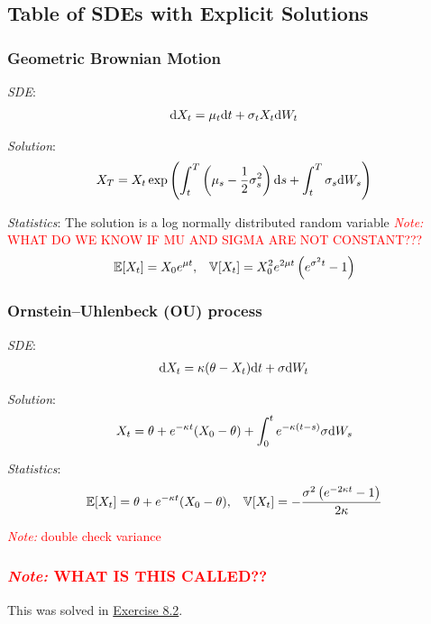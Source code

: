 \documentclass[12pt]{article}
\newcommand{\note}[1]{\textcolor{red}{\textit{Note:} #1}}
\begin{document}
\subsection{Table of SDEs with Explicit Solutions}
\subsubsection{Geometric Brownian Motion}
\textit{SDE}:
\begin{align*}
    \mathrm{d} X_t = \mu_t \mathrm{d} t + \sigma_t X_t \mathrm{d} W_t
\end{align*}

\textit{Solution}:
\begin{align*}
    X_T = X_t  \exp\left( \int_t^T \left( \mu_s - \frac{1}{2}\sigma_s^2\right)\mathrm{d} s + \int_t^T\sigma_s \mathrm{d} W_s \right)
\end{align*}

\textit{Statistics}:
The solution is a log normally distributed random variable
\note{WHAT DO WE KNOW IF MU AND SIGMA ARE NOT CONSTANT???}
\begin{align*}
    \mathbb{E}[X_t] = X_0 e^{\mu t} 
    ,&&
    \mathbb{V}[X_t] = X_0^2 e^{2\mu t} \left( e^{\sigma^2 t}-1 \right)
\end{align*}


\subsubsection{Ornstein--Uhlenbeck (OU) process}
\textit{SDE}:
\begin{align*}
    \mathrm{d} X_t = \kappa(\theta-X_t)\mathrm{d} t + \sigma \mathrm{d} W_t
\end{align*}

\textit{Solution}:
\begin{align*}
    X_t = \theta + e^{-\kappa t}(X_0-\theta) + \int_0^t e^{-\kappa(t-s)}\sigma \mathrm{d} W_s
\end{align*}

\textit{Statistics}:
\begin{align*}
    \mathbb{E}[X_t] =  \theta + e^{-\kappa t}(X_0 - \theta)
    ,&&
    \mathbb{V}[X_t] = -\frac{\sigma ^2 \left(e^{-2 \kappa  t}-1\right)}{2 \kappa } 
\end{align*}

\note{double check variance}

\subsubsection{\note{WHAT IS THIS CALLED??}}
This was solved in \hyperref[Exercise 8.2]{Exercise 8.2}.
\end{document}
